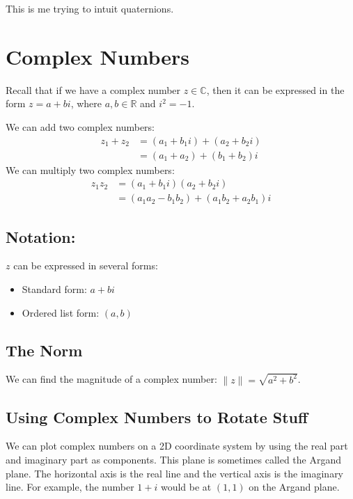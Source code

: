 \documentclass[12pt]{article}
\begin{document}
	This is me trying to intuit quaternions.
	
	\section{Complex Numbers}
	
	Recall that if we have a complex number $z \in \mathbb{C}$, then it can be expressed in the form $z = a + bi$, where $a,b \in \mathbb{R}$ and $i^2 = -1$.
	
	We can add two complex numbers: 
		\begin{align*}
			z_1 + z_2 &= (a_1 + b_1i) + (a_2 + b_2i) \\
					  &= (a_1 + a_2) + (b_1 + b_2)i				  
		\end{align*}
	We can multiply two complex numbers:
		\begin{align*}
			z_1 z_2 &= (a_1 + b_1i)(a_2 + b_2i) \\
					&= (a_1 a_2 - b_1 b_2) + (a_1 b_2 + a_2 b_1)i
		\end{align*}
		
	\subsection{Notation:}
	
	$z$ can be expressed in several forms:
	\begin{itemize}
		\item Standard form: $a + bi$
		\item Ordered list form: $(a, b)$
	\end{itemize}
	
	\subsection{The Norm}
	
	We can find the magnitude of a complex number: $\|z\| = \sqrt{a^2 + b^2}$.
		
	\subsection{Using Complex Numbers to Rotate Stuff}
	
	We can plot complex numbers on a 2D coordinate system by using the real part and imaginary part as components. 
	This plane is sometimes called the Argand plane. The horizontal axis is the real line and the vertical axis is the imaginary line. 
	For example, the number $1 + i$ would be at $(1,1)$ on the Argand plane.
\end{document}
